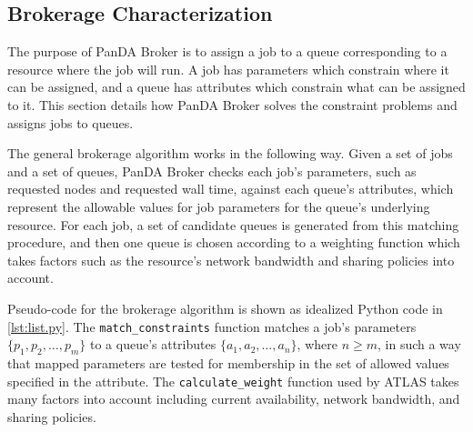 \subsection{Brokerage Characterization}
\label{subsec:brokerage}

The purpose of PanDA Broker is to assign a job to a queue corresponding to a
resource where the job will run. A job has parameters which constrain where it
can be assigned, and a queue has attributes which constrain what can be
assigned to it. This section details how PanDA Broker solves the constraint
problems and assigns jobs to queues.

The general brokerage algorithm works in the following way. Given a set of jobs
and a set of queues, PanDA Broker checks each job's parameters, such as
requested nodes and requested wall time, against each queue's attributes, which
represent the allowable values for job parameters for the queue's underlying
resource. For each job, a set of candidate queues is generated from this
matching procedure, and then one queue is chosen according to a weighting
function which takes factors such as the resource's network bandwidth and
sharing policies into account.

Pseudo-code for the brokerage algorithm is shown as idealized Python code in
\ref{lst:list.py}. The \texttt{match\_constraints} function matches a job's
parameters $\{p_1, p_2, \ldots, p_m\}$ to a queue's attributes $\{a_1, a_2,
\ldots, a_n\}$, where $n \geq m$, in such a way that mapped parameters are
tested for membership in the set of allowed values specified in the attribute.
The \texttt{calculate\_weight} function used by ATLAS takes many factors into
account including current availability, network bandwidth, and sharing policies.



